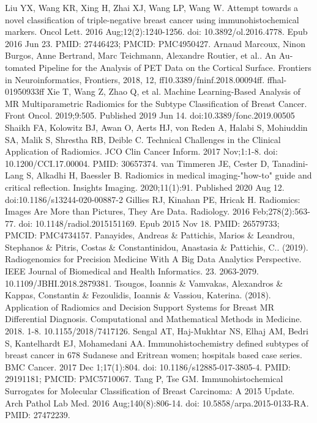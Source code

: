 \documentclass[final,1p,times,twocolumn]{elsarticle}
\begin{document}
\begin{thebibliography}{00}
 Liu YX, Wang KR, Xing H, Zhai XJ, Wang LP, Wang W. Attempt towards a novel classification of triple-negative breast cancer using immunohistochemical markers. Oncol Lett. 2016 Aug;12(2):1240-1256. doi: 10.3892/ol.2016.4778. Epub 2016 Jun 23. PMID: 27446423; PMCID: PMC4950427.
 Arnaud Marcoux, Ninon Burgos, Anne Bertrand, Marc Teichmann, Alexandre Routier, et al.. An Au-
tomated Pipeline for the Analysis of PET Data on the Cortical Surface. Frontiers in Neuroinformatics, Frontiers, 2018, 12, ff10.3389/fninf.2018.00094ff. ffhal-01950933ff
 Xie T, Wang Z, Zhao Q, et al. Machine Learning-Based Analysis of MR Multiparametric Radiomics for the Subtype Classification of Breast Cancer. Front Oncol. 2019;9:505. Published 2019 Jun 14. doi:10.3389/fonc.2019.00505
 Shaikh FA, Kolowitz BJ, Awan O, Aerts HJ, von Reden A, Halabi S, Mohiuddin SA, Malik S, Shrestha RB, Deible C. Technical Challenges in the Clinical Application of Radiomics. JCO Clin Cancer Inform. 2017 Nov;1:1-8. doi: 10.1200/CCI.17.00004. PMID: 30657374.
 van Timmeren JE, Cester D, Tanadini-Lang S, Alkadhi H, Baessler B. Radiomics in medical imaging-"how-to" guide and critical reflection. Insights Imaging. 2020;11(1):91. Published 2020 Aug 12. doi:10.1186/s13244-020-00887-2
 Gillies RJ, Kinahan PE, Hricak H. Radiomics: Images Are More than Pictures, They Are Data. Radiology. 2016 Feb;278(2):563-77. doi: 10.1148/radiol.2015151169. Epub 2015 Nov 18. PMID: 26579733; PMCID: PMC4734157.
 Panayides, Andreas \& Pattichis, Marios \& Leandrou, Stephanos \& Pitris, Costas \& Constantinidou, Anastasia \& Pattichis, C.. (2019). Radiogenomics for Precision Medicine With A Big Data Analytics Perspective. IEEE Journal of Biomedical and Health Informatics. 23. 2063-2079. 10.1109/JBHI.2018.2879381. 
 Tsougos, Ioannis \& Vamvakas, Alexandros \& Kappas, Constantin \& Fezoulidis, Ioannis \& Vassiou, Katerina. (2018). Application of Radiomics and Decision Support Systems for Breast MR Differential Diagnosis. Computational and Mathematical Methods in Medicine. 2018. 1-8. 10.1155/2018/7417126.
 Sengal AT, Haj-Mukhtar NS, Elhaj AM, Bedri S, Kantelhardt EJ, Mohamedani AA. Immunohistochemistry defined subtypes of breast cancer in 678 Sudanese and Eritrean women; hospitals based case series. BMC Cancer. 2017 Dec 1;17(1):804. doi: 10.1186/s12885-017-3805-4. PMID: 29191181; PMCID: PMC5710067.
 Tang P, Tse GM. Immunohistochemical Surrogates for Molecular Classification of Breast Carcinoma: A 2015 Update. Arch Pathol Lab Med. 2016 Aug;140(8):806-14. doi: 10.5858/arpa.2015-0133-RA. PMID: 27472239.

\end{thebibliography}
\end{document}
